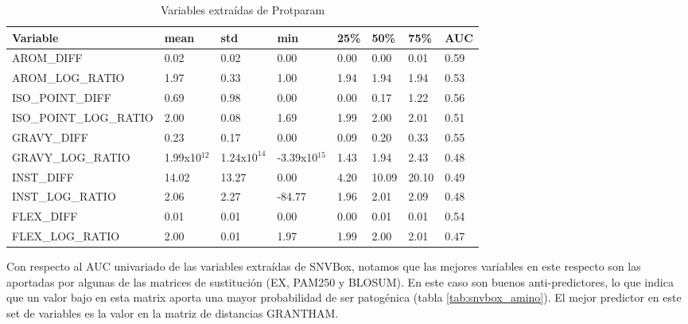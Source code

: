 \begin{table}[H]
\centering
\begin{tabular}{|l|l|l|l|l|l|l|l|}
\hline
Variable & mean & std & min & 25\% & 50\%  & 75\%  & AUC \\ \hline
AROM\_DIFF  & 0.02  & 0.02  & 0.00 & 0.00 & 0.00  & 0.01  & 0.59 \\ \hline
AROM\_LOG\_RATIO & 1.97 & 0.33 & 1.00 & 1.94 & 1.94  & 1.94  & 0.53 \\ \hline
ISO\_POINT\_DIFF & 0.69  & 0.98 & 0.00  & 0.00 & 0.17  & 1.22  & 0.56 \\ \hline
ISO\_POINT\_LOG\_RATIO & 2.00 & 0.08 & 1.69 & 1.99 & 2.00  & 2.01  & 0.51 \\ \hline
GRAVY\_DIFF & 0.23 & 0.17 & 0.00 & 0.09 & 0.20  & 0.33  & 0.55 \\ \hline
GRAVY\_LOG\_RATIO & 1.99x10$^{12}$ & 1.24x$10^{14}$ & -3.39x10$^{15}$ & 1.43 & 1.94 & 2.43 & 0.48 \\\hline
INST\_DIFF & 14.02 & 13.27 & 0.00 & 4.20 & 10.09 & 20.10 & 0.49 \\ \hline
INST\_LOG\_RATIO & 2.06 & 2.27 & -84.77 & 1.96 & 2.01  & 2.09  & 0.48 \\ \hline
FLEX\_DIFF & 0.01 & 0.01 & 0.00 & 0.00 & 0.01  & 0.01  & 0.54 \\ \hline
FLEX\_LOG\_RATIO & 2.00 & 0.01 & 1.97 & 1.99 & 2.00  & 2.01  & 0.47 \\ \hline
\end{tabular}
\caption{Variables extraídas de Protparam}
\label{tab:protparam_vars}
\end{table}

\newpage

Con respecto al AUC univariado de las variables extraídas de SNVBox, notamos que las mejores variables en este respecto son las aportadas por algunas de las matrices de sustitución (EX, PAM250 y BLOSUM). En este caso son buenos anti-predictores, lo que indica que un valor bajo en esta matrix aporta una mayor probabilidad de ser patogénica (tabla \ref{tab:snvbox_amino}). El mejor predictor en este set de variables es la valor en la matriz de distancias GRANTHAM.  




